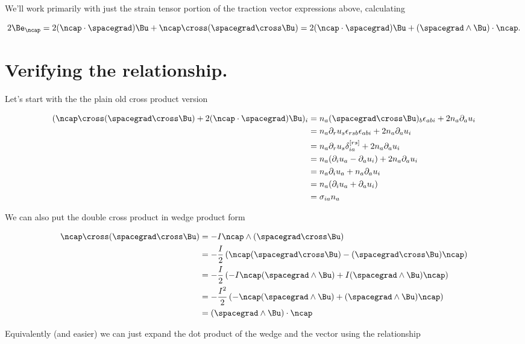 We'll work primarily with just the strain tensor portion of the traction vector expressions above, calculating

\begin{equation}\label{eqn:stressTensorVectorForm:250}
2 {\Be}_{\ncap}
=
2 (\ncap \cdot \spacegrad)\Bu + \ncap \cross (\spacegrad \cross \Bu)
=
2 (\ncap \cdot \spacegrad)\Bu + (\spacegrad \wedge \Bu) \cdot \ncap.
\end{equation}

\section{Verifying the relationship.}

Let's start with the the plain old cross product version

\begin{align*}
(\ncap \cross (\spacegrad \cross \Bu) + 2 (\ncap \cdot \spacegrad) \Bu)_i
&=
n_a (\spacegrad \cross \Bu)_b \epsilon_{a b i}  + 2 n_a \partial_a u_i \\
&=
n_a \partial_r u_s \epsilon_{r s b} \epsilon_{a b i}  + 2 n_a \partial_a u_i \\
&=
n_a \partial_r u_s \delta_{ia}^{[rs]} + 2 n_a \partial_a u_i \\
&=
n_a ( \partial_i u_a -\partial_a u_i ) + 2 n_a \partial_a u_i \\
&=
n_a \partial_i u_a + n_a \partial_a u_i \\
&=
n_a (\partial_i u_a + \partial_a u_i) \\
&=
\sigma_{i a } n_a 
\end{align*}

We can also put the double cross product in wedge product form

\begin{align*}
\ncap \cross (\spacegrad \cross \Bu)
&=
-I \ncap \wedge (\spacegrad \cross \Bu) \\
&=
-\frac{I}{2} 
\left(
\ncap (\spacegrad \cross \Bu) 
- (\spacegrad \cross \Bu) \ncap
\right) \\
&=
-\frac{I}{2} 
\left(
-I \ncap (\spacegrad \wedge \Bu) 
+ I (\spacegrad \wedge \Bu) \ncap
\right) \\
&=
-\frac{I^2}{2} 
\left(
- \ncap (\spacegrad \wedge \Bu) 
+ (\spacegrad \wedge \Bu) \ncap
\right) \\
&=
(\spacegrad \wedge \Bu) \cdot \ncap
\end{align*}

Equivalently (and easier) we can just expand the dot product of the wedge and the vector using the relationship

